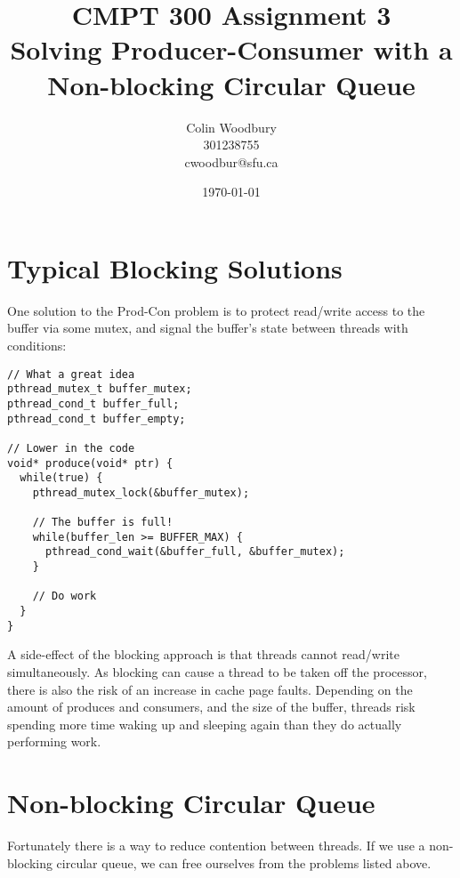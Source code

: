 \documentclass[titlepage]{article}
\begin{document}
\title{CMPT 300 Assignment 3 \\ Solving Producer-Consumer with a Non-blocking
Circular Queue}
\author{Colin Woodbury\\ 301238755\\ cwoodbur@sfu.ca}
\date{\today}
\maketitle



\section{Typical Blocking Solutions}
One solution to the Prod-Con problem is to protect read/write access to
the buffer via some mutex, and signal the buffer's state between threads
with conditions:

\begin{lstlisting}
// What a great idea
pthread_mutex_t buffer_mutex;
pthread_cond_t buffer_full;
pthread_cond_t buffer_empty;

// Lower in the code
void* produce(void* ptr) {
  while(true) {
    pthread_mutex_lock(&buffer_mutex);

    // The buffer is full!
    while(buffer_len >= BUFFER_MAX) {
      pthread_cond_wait(&buffer_full, &buffer_mutex);
    }

    // Do work
  }
}
\end{lstlisting}

A side-effect of the blocking approach is that threads cannot read/write
simultaneously. As blocking can cause a thread to be taken off the
processor, there is also the risk of an increase in cache page faults.
Depending on the amount of produces and consumers, and the size of the
buffer, threads risk spending more time waking up and sleeping again than
they do actually performing work.

\section{Non-blocking Circular Queue}
Fortunately there is a way to reduce contention between threads. If we use
a non-blocking circular queue, we can free ourselves from the problems listed
above.
\end{document}
